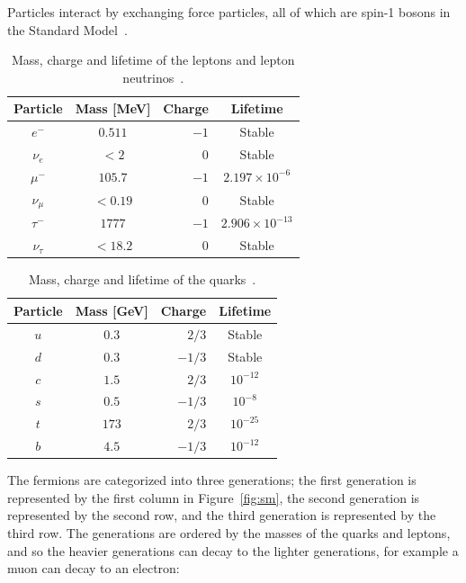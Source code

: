 Particles interact by exchanging force particles, all of which are spin-1 bosons in the Standard Model~\cite{martin}.


\begin{table}
\begin{center}
\begin{tabular}{||c c r c||} 
 \hline
 Particle & Mass [MeV] & Charge & Lifetime \\ [0.5ex] 
 \hline\hline
 $e^{-}$ & $0.511$ & $-1$ & Stable \\ 
 \hline
 $\nu_e$ & $<2$ & $0$ & Stable \\
 \hline
 $\mu^{-}$ & $105.7$ & $-1$ & $2.197 \times 10^{-6}$ \\
 \hline
 $\nu_\mu$ & $<0.19$ & $0$ & Stable \\
 \hline
 $\tau^{-}$ & $1777$ & $-1$ & $2.906 \times 10^{-13}$  \\
 \hline
 $\nu_\tau$ & $<18.2$ & $0$ & Stable \\ [1ex] 
 \hline
\end{tabular}
\end{center}
\caption{Mass, charge and lifetime of the leptons and lepton neutrinos~\cite{martin}.}
\label{tab:leptons}
\end{table}

\begin{table}
\begin{center}
\begin{tabular}{||c c r c||} 
 \hline
 Particle & Mass [GeV] & Charge & Lifetime \\ [0.5ex] 
 \hline\hline
 $u$ & $0.3$ & $2/3$ & Stable \\ 
 \hline
 $d$ & $0.3$ & $-1/3$ & Stable \\
 \hline
 $c$ & $1.5$ & $2/3$ & $10^{-12}$ \\
 \hline
 $s$ & $0.5$ & $-1/3$ & $10^{-8}$ \\
 \hline
 $t$ & $173$ & $2/3$ & $10^{-25}$  \\
 \hline
 $b$ & $4.5$ & $-1/3$ & $10^{-12}$ \\ [1ex] 
 \hline
\end{tabular}
\end{center}
\caption{Mass, charge and lifetime of the quarks~\cite{martin}.}
\label{tab:quarks}
\end{table}


The fermions are categorized into three generations; the first generation is represented by the first column in Figure~\ref{fig:sm}, the second generation is represented by the second row, and the third generation is represented by the third row. The generations are ordered by the masses of the quarks and leptons, and so the heavier generations can decay to the lighter generations, for example a muon can decay to an electron:

